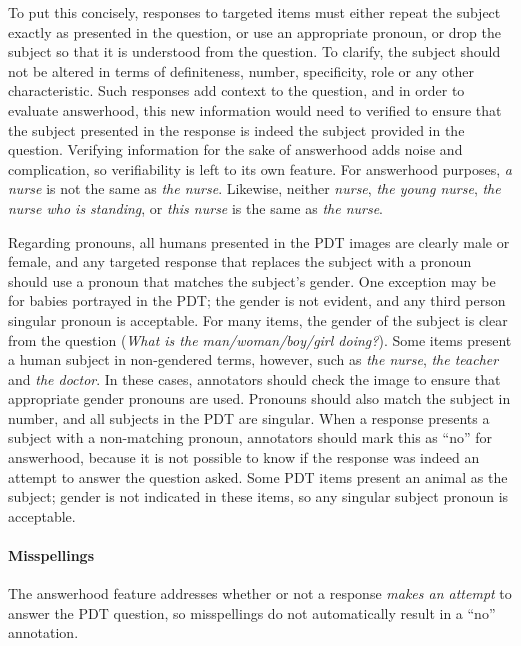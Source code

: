 \documentclass[12pt,notitlepage]{article}
\begin{document}
To put this concisely, responses to targeted items must either repeat the subject exactly as presented in the question, or use an appropriate pronoun, or drop the subject so that it is understood from the question. To clarify, the subject should not be altered in terms of definiteness, number, specificity, role or any other characteristic. Such responses add context to the question, and in order to evaluate answerhood, this new information would need to verified to ensure that the subject presented in the response is indeed the subject provided in the question. Verifying information for the sake of answerhood adds noise and complication, so verifiability is left to its own feature. For answerhood purposes, \textit{a nurse} is not the same as \textit{the nurse}. Likewise, neither \textit{nurse}, \textit{the young nurse}, \textit{the nurse who is standing}, or \textit{this nurse} is the same as \textit{the nurse}.

Regarding pronouns, all humans presented in the PDT images are clearly male or female, and any targeted response that replaces the subject with a pronoun should use a pronoun that matches the subject's gender. One exception may be for babies portrayed in the PDT; the gender is not evident, and any third person singular pronoun is acceptable. For many items, the gender of the subject is clear from the question (\textit{What is the man/woman/boy/girl doing?}). Some items present a human subject in non-gendered terms, however, such as \textit{the nurse}, \textit{the teacher} and \textit{the doctor}. In these cases, annotators should check the image to ensure that appropriate gender pronouns are used. Pronouns should also match the subject in number, and all subjects in the PDT are singular. When a response presents a subject with a non-matching pronoun, annotators should mark this as ``no'' for answerhood, because it is not possible to know if the response was indeed an attempt to answer the question asked. Some PDT items present an animal as the subject; gender is not indicated in these items, so any singular subject pronoun is acceptable.

\paragraph{Misspellings}
\label{para:answerhood-misspellings}
The answerhood feature addresses whether or not a response \textit{makes an attempt} to answer the PDT question, so misspellings do not automatically result in a ``no'' annotation. 
\end{document}

